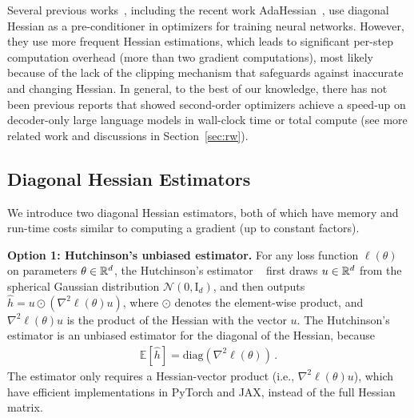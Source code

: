 Several previous works~\citep{becker1988improving, chapelle2011improved,schaul2013no}, including the recent work AdaHessian~\citep{yao2021adahessian}, use diagonal Hessian as a pre-conditioner in optimizers for training neural networks. However, they use more frequent Hessian estimations, which leads to significant per-step computation overhead (more than two gradient computations), most likely because of the lack of the clipping mechanism that safeguards against inaccurate and changing Hessian. In general, to the best of our knowledge, there has not been previous reports that showed second-order optimizers achieve a speed-up on decoder-only large language models in wall-clock time or total compute (see more related work and discussions in Section~\ref{sec:rw}). 


\subsection{Diagonal Hessian Estimators}\label{sec:hess_estimator}
 We introduce two diagonal Hessian estimators, both of which have memory and run-time costs similar to computing a gradient (up to constant factors).  


\textbf{Option 1: Hutchinson's unbiased estimator.} For any loss function $\ell(\theta)$ on parameters $\theta\in \mathbb{R}^d$,  the Hutchinson's estimator  ~\citep{hutchinson1989stochastic,roosta2015improved,yao2021adahessian} first draws $u\in \mathbb{R}^d$ from the spherical Gaussian distribution $\mathcal{N}(0,\mathrm{I}_d)$, and then outputs $\hat{h} = u \odot (\nabla^2 \ell(\theta) u)$, where $\odot$ denotes the element-wise product, and $\nabla^2 \ell(\theta) u$ is the product of the Hessian with the vector $u$. The Hutchinson's estimator is an unbiased estimator for the diagonal of the Hessian, because
\begin{align}
\mathbb{E}[\hat h] = \mathrm{diag}(\nabla^2 \ell(\theta))\,.
\end{align}
The estimator only requires a Hessian-vector product (i.e., $\nabla^2 \ell(\theta) u$), which have efficient implementations in PyTorch and JAX, instead of the full Hessian matrix. 

